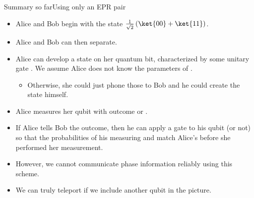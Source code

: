 \begin{frame}{Summary so far}{Using only an EPR pair}

\begin{itemize}[<+->]
    \item Alice and Bob begin with the state $\RootTwo{}\left(\ket{00}+\ket{11}\right)$.
    \item Alice and Bob can then separate.
    \item Alice can develop a state on her quantum bit, characterized by some unitary gate .  We assume Alice does not know the parameters of .
    \begin{itemize}
        \item Otherwise, she could just phone those to Bob and he could create the state himself.
    \end{itemize}
    \item Alice measures her qubit with outcome  or .
    \item If Alice tells Bob the outcome, then he can apply a gate to his qubit (or not) so that the probabilities of his measuring  and  match Alice's before she performed her measurement.
    \item However, we cannot communicate phase information reliably using this scheme.
    \item We can truly teleport if we include another qubit in the picture.
\end{itemize}

\end{frame}

